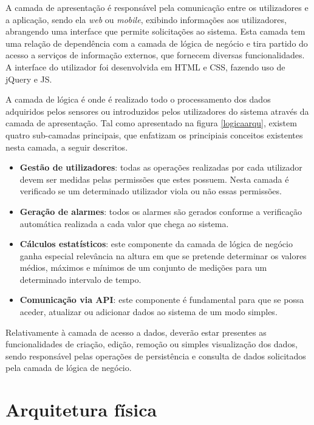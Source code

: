 A camada de apresentação é responsável pela comunicação entre os utilizadores e a aplicação, sendo ela \textit{web} ou \textit{mobile}, exibindo informações aos utilizadores, abrangendo uma interface que permite solicitações ao sistema. Esta camada tem uma relação de dependência com a camada de lógica de negócio e tira partido do acesso a serviços de informação externos, que fornecem diversas funcionalidades. A interface do utilizador foi desenvolvida em  \ac{HTML} e \acs{CSS}, fazendo uso de jQuery e \ac{JS}.


A camada de lógica é onde é realizado todo o processamento dos dados adquiridos pelos sensores ou introduzidos pelos utilizadores do sistema através da camada de apresentação.  Tal como apresentado na figura \ref{logicaarqu}, existem quatro sub-camadas principais, que enfatizam os principiais conceitos existentes nesta camada, a seguir descritos.  


\begin{itemize}
	\item \textbf{Gestão de utilizadores}: todas as operações realizadas por cada utilizador devem ser medidas pelas permissões que estes possuem. Nesta camada é verificado se um determinado utilizador viola ou não essas permissões. 
	
	\item \textbf{Geração de alarmes}: todos os alarmes são gerados conforme a verificação automática realizada a cada valor que chega ao sistema. 
	\item \textbf{Cálculos estatísticos}: este componente da camada de lógica de negócio ganha especial relevância na altura em que se pretende determinar os valores médios, máximos e mínimos de um conjunto de medições para um determinado intervalo de tempo. 
	\item \textbf{Comunicação via \ac{API}}: este componente é fundamental para que se possa aceder, atualizar ou adicionar dados ao sistema de um modo simples.
\end{itemize}

Relativamente à camada de acesso a dados, deverão estar presentes as funcionalidades de criação, edição, remoção ou simples visualização dos dados, sendo responsável pelas operações de persistência e consulta de dados solicitados pela camada de lógica de negócio.


\section{Arquitetura física}


